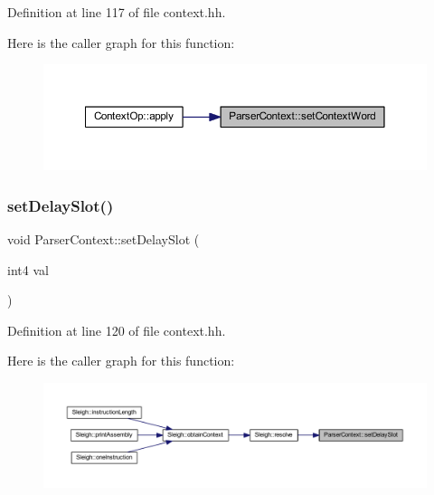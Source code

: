 Definition at line 117 of file context.\+hh.

Here is the caller graph for this function\+:
\nopagebreak
\begin{figure}[H]
\begin{center}
\leavevmode
\includegraphics[width=350pt]{class_parser_context_a1242790851c096298227efeab13a2df0_icgraph}
\end{center}
\end{figure}
\mbox{\label{class_parser_context_a86fae2fe1c96a52c234b8b4533e4687e}} 
\subsubsection{\texorpdfstring{setDelaySlot()}{setDelaySlot()}}
{\footnotesize\ttfamily void Parser\+Context\+::set\+Delay\+Slot (\begin{DoxyParamCaption}\item[{int4}]{val }\end{DoxyParamCaption})\hspace{0.3cm}{\ttfamily [inline]}}



Definition at line 120 of file context.\+hh.

Here is the caller graph for this function\+:
\nopagebreak
\begin{figure}[H]
\begin{center}
\leavevmode
\includegraphics[width=350pt]{class_parser_context_a86fae2fe1c96a52c234b8b4533e4687e_icgraph}
\end{center}
\end{figure}
\mbox{\label{class_parser_context_ae9a4db4a509177c0797092372dfaabcb}} 
